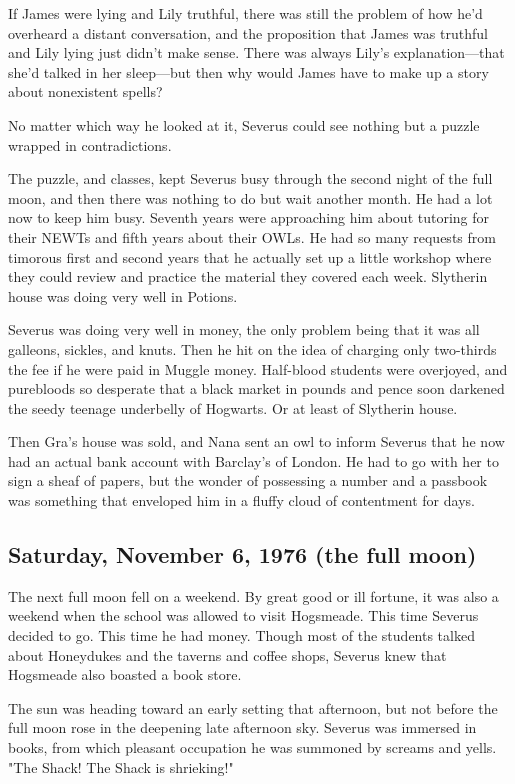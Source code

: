If James were lying and Lily truthful, there was still the problem of how he'd overheard a distant conversation, and the proposition that James was truthful and Lily lying just didn't make sense. There was always Lily's explanation—that she'd talked in her sleep—but then why would James have to make up a story about nonexistent spells?

No matter which way he looked at it, Severus could see nothing but a puzzle wrapped in contradictions.

The puzzle, and classes, kept Severus busy through the second night of the full moon, and then there was nothing to do but wait another month. He had a lot now to keep him busy. Seventh years were approaching him about tutoring for their NEWTs and fifth years about their OWLs. He had so many requests from timorous first and second years that he actually set up a little workshop where they could review and practice the material they covered each week. Slytherin house was doing very well in Potions.

Severus was doing very well in money, the only problem being that it was all galleons, sickles, and knuts. Then he hit on the idea of charging only two-thirds the fee if he were paid in Muggle money. Half-blood students were overjoyed, and purebloods so desperate that a black market in pounds and pence soon darkened the seedy teenage underbelly of Hogwarts. Or at least of Slytherin house.

Then Gra's house was sold, and Nana sent an owl to inform Severus that he now had an actual bank account with Barclay's of London. He had to go with her to sign a sheaf of papers, but the wonder of possessing a number and a passbook was something that enveloped him in a fluffy cloud of contentment for days.

\subsection{Saturday, November 6, 1976 (the full moon)}

The next full moon fell on a weekend. By great good or ill fortune, it was also a weekend when the school was allowed to visit Hogsmeade. This time Severus decided to go. This time he had money. Though most of the students talked about Honeydukes and the taverns and coffee shops, Severus knew that Hogsmeade also boasted a book store.

The sun was heading toward an early setting that afternoon, but not before the full moon rose in the deepening late afternoon sky. Severus was immersed in books, from which pleasant occupation he was summoned by screams and yells. "The Shack! The Shack is shrieking!"

